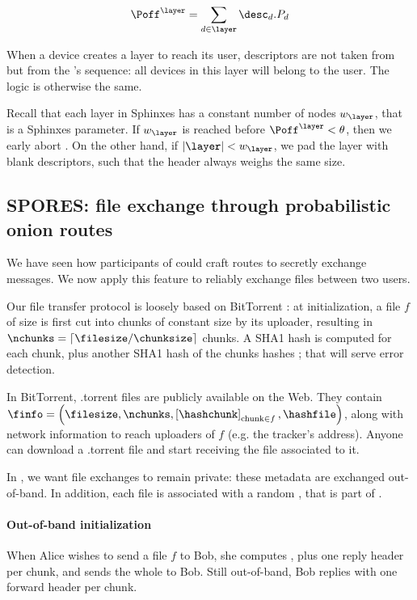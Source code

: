 $$ \Poff^\layer = \sum\limits_{d \in \layer}\desc_d.P_d $$

When a device creates a layer to reach its user, descriptors are not taken from \rpsview but from the \squad's sequence: all devices in this layer will belong to the user.
The logic is otherwise the same.

Recall that each layer in Sphinxes has a constant number of nodes $w_\layer$, that is a Sphinxes parameter.
If $w_\layer$ is reached before $\Poff^\layer < \theta$, then we early abort \CreateLayer.
On the other hand, if $|\layer| < w_\layer$, we pad the layer with blank descriptors, such that the header always weighs the same size.


\subsection{SPORES: file exchange through probabilistic onion routes}
\label{ssec:spores_file_exchange_through_probabilistic_onion_routes}


We have seen how participants of \name could craft routes to secretly exchange messages.
We now apply this feature to reliably exchange files between two users.

Our file transfer protocol is loosely based on BitTorrent \cite{bt_bep3}: 
at initialization, a file $f$ of size \filesize is first cut into chunks of constant size \chunksize by its uploader,
resulting in $\nchunks = \lceil \filesize / \chunksize \rceil$ chunks.
A SHA1 hash \hashchunk is computed for each chunk, plus another SHA1 hash \hashfile of the chunks hashes ; that will serve error detection. 


In BitTorrent, .torrent files are publicly available on the Web.
They contain $\finfo = \left(\filesize, \nchunks, \left[\hashchunk\right]_{\text{chunk} \in f}, \hashfile\right)$, 
along with network information to reach uploaders of $f$ (e.g. the tracker's address).
Anyone can download a .torrent file and start receiving the file associated to it.

In \name, we want file exchanges to remain private: these metadata are exchanged out-of-band.
In addition, each file is associated with a random \fileid, that is part of \finfo.

\paragraph*{Out-of-band initialization} 
When Alice wishes to send a file $f$ to Bob, she computes \finfo, 
plus one reply header per chunk, and sends the whole to Bob.
Still out-of-band, Bob replies with one forward header per chunk.

